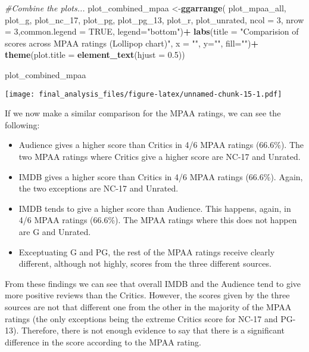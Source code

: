 \documentclass[]{article}
\newenvironment{Shaded}{\begin{snugshade}}{\end{snugshade}}
\newcommand{\KeywordTok}[1]{\textcolor[rgb]{0.13,0.29,0.53}{\textbf{#1}}}
\newcommand{\DataTypeTok}[1]{\textcolor[rgb]{0.13,0.29,0.53}{#1}}
\newcommand{\DecValTok}[1]{\textcolor[rgb]{0.00,0.00,0.81}{#1}}
\newcommand{\FloatTok}[1]{\textcolor[rgb]{0.00,0.00,0.81}{#1}}
\newcommand{\StringTok}[1]{\textcolor[rgb]{0.31,0.60,0.02}{#1}}
\newcommand{\CommentTok}[1]{\textcolor[rgb]{0.56,0.35,0.01}{\textit{#1}}}
\newcommand{\OtherTok}[1]{\textcolor[rgb]{0.56,0.35,0.01}{#1}}
\newcommand{\OperatorTok}[1]{\textcolor[rgb]{0.81,0.36,0.00}{\textbf{#1}}}
\newcommand{\NormalTok}[1]{#1}
\providecommand{\tightlist}{%
  \setlength{\itemsep}{0pt}\setlength{\parskip}{0pt}}
\begin{document}
\begin{Shaded}
\begin{Highlighting}[]
\CommentTok{#Combine the plots...}
\NormalTok{plot_combined_mpaa <-}\KeywordTok{ggarrange}\NormalTok{(}
\NormalTok{  plot_mpaa_all,}
\NormalTok{  plot_g,}
\NormalTok{  plot_nc_}\DecValTok{17}\NormalTok{,}
\NormalTok{  plot_pg,}
\NormalTok{  plot_pg_}\DecValTok{13}\NormalTok{,}
\NormalTok{  plot_r,}
\NormalTok{  plot_unrated,}
  \DataTypeTok{ncol =} \DecValTok{3}\NormalTok{,}
  \DataTypeTok{nrow =} \DecValTok{3}\NormalTok{,}\DataTypeTok{common.legend =} \OtherTok{TRUE}\NormalTok{, }\DataTypeTok{legend=}\StringTok{"bottom"}\NormalTok{)}\OperatorTok{+}
\StringTok{  }\KeywordTok{labs}\NormalTok{(}\DataTypeTok{title =} \StringTok{"Comparision of scores across MPAA ratings (Lollipop chart)"}\NormalTok{, }\DataTypeTok{x =} \StringTok{""}\NormalTok{, }\DataTypeTok{y=}\StringTok{""}\NormalTok{, }\DataTypeTok{fill=}\StringTok{""}\NormalTok{)}\OperatorTok{+}
\StringTok{  }\KeywordTok{theme}\NormalTok{(}\DataTypeTok{plot.title =} \KeywordTok{element_text}\NormalTok{(}\DataTypeTok{hjust =} \FloatTok{0.5}\NormalTok{))}


\NormalTok{plot_combined_mpaa}
\end{Highlighting}
\end{Shaded}

\texttt{[image: final\_analysis\_files/figure-latex/unnamed-chunk-15-1.pdf]}

If we now make a similar comparison for the MPAA ratings, we can see the
following:

\begin{itemize}
\tightlist
\item
  Audience gives a higher score than Critics in 4/6 MPAA ratings
  (66.6\%). The two MPAA ratings where Critics give a higher score are
  NC-17 and Unrated.
\item
  IMDB gives a higher score than Critics in 4/6 MPAA ratings (66.6\%).
  Again, the two exceptions are NC-17 and Unrated.
\item
  IMDB tends to give a higher score than Audience. This happens, again,
  in 4/6 MPAA ratings (66.6\%). The MPAA ratings where this does not
  happen are G and Unrated.
\item
  Exceptuating G and PG, the rest of the MPAA ratings receive clearly
  different, although not highly, scores from the three different
  sources.
\end{itemize}

From these findings we can see that overall IMDB and the Audience tend
to give more positive reviews than the Critics. However, the scores
given by the three sources are not that different one from the other in
the majority of the MPAA ratings (the only exceptions being the extreme
Critics score for NC-17 and PG-13). Therefore, there is not enough
evidence to say that there is a significant difference in the score
according to the MPAA rating.
\end{document}
